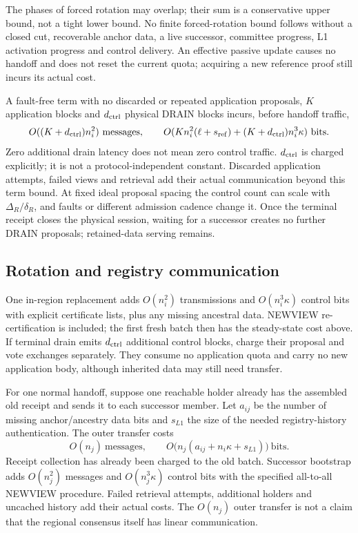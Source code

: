 \documentclass[11pt,a4paper,onecolumn]{article}
\newcounter{protocol}
\begin{document}
The phases of forced rotation may overlap; their sum is a conservative upper
bound, not a tight lower bound. No finite forced-rotation bound
follows without a closed cut, recoverable anchor data, a live successor,
committee progress, L1 activation progress and control delivery. An
effective passive update causes no handoff and does not reset the current
quota; acquiring a new reference proof still incurs its actual cost.

A fault-free term with no discarded or repeated application proposals,
$K$ application blocks and $d_{\rm ctrl}$ physical DRAIN blocks incurs,
before handoff traffic,
\[
 O((K+d_{\rm ctrl})n_i^2)\ \text{messages},\qquad
 O(Kn_i^2(\ell+s_{\rm ref})+(K+d_{\rm ctrl})n_i^3\kappa)\ \text{bits}.
\]
Zero additional drain latency does not mean zero control traffic.
$d_{\rm ctrl}$ is charged explicitly; it is not a protocol-independent
constant. Discarded application attempts, failed views and retrieval add
their actual communication beyond this term bound. At fixed ideal proposal
spacing the control count can scale with
$\Delta_R/\delta_R$, and faults or different admission cadence change it.
Once the terminal receipt closes the physical session, waiting for a
successor creates no further DRAIN proposals; retained-data serving remains.

\subsection{Rotation and registry communication}
One in-region replacement adds $O(n_i^2)$ transmissions and
$O(n_i^3\kappa)$ control bits with explicit certificate lists, plus any
missing ancestral data. NEWVIEW re-certification is included; the first
fresh batch then has the steady-state cost above. If terminal drain emits
$d_{\rm ctrl}$ additional control blocks, charge their proposal and vote exchanges
separately. They consume no application quota and carry no new application
body, although inherited data may still need transfer.

For one normal handoff, suppose one reachable holder already has the
assembled old receipt and sends it to each successor member. Let $a_{ij}$
be the number of missing anchor/ancestry data bits and $s_{L1}$ the size of
the needed registry-history authentication. The outer transfer costs
\[
 O(n_j)\ \text{messages},\qquad
 O\bigl(n_j(a_{ij}+n_i\kappa+s_{L1})\bigr)\ \text{bits}.
\]
Receipt collection has already been charged to the old batch. Successor
bootstrap adds $O(n_j^2)$ messages and $O(n_j^3\kappa)$ control bits with
the specified all-to-all NEWVIEW procedure. Failed retrieval attempts,
additional holders and uncached history add their actual costs. The
$O(n_j)$ outer transfer is not a claim that the regional consensus itself
has linear communication.
\end{document}
